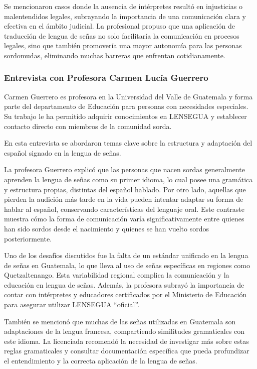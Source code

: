 Se mencionaron casos donde la ausencia de intérpretes resultó en injusticias o malentendidos legales, subrayando la importancia de una comunicación clara y efectiva en el ámbito judicial. La profesional propuso que una aplicación de traducción de lengua de señas no solo facilitaría la comunicación en procesos legales, sino que también promovería una mayor autonomía para las personas sordomudas, eliminando muchas barreras que enfrentan cotidianamente.

\subsubsection{Entrevista con Profesora Carmen Lucía Guerrero}

Carmen Guerrero es profesora en la Universidad del Valle de Guatemala y forma parte del departamento de Educación para personas con necesidades especiales. Su trabajo le ha permitido adquirir conocimientos en LENSEGUA y establecer contacto directo con miembros de la comunidad sorda.

En esta entrevista se abordaron temas clave sobre la estructura y adaptación del español signado en la lengua de señas. 

La profesora Guerrero explicó que las personas que nacen sordas generalmente aprenden la lengua de señas como su primer idioma, lo cual posee una gramática y estructura propias, distintas del español hablado. Por otro lado, aquellas que pierden la audición más tarde en la vida pueden intentar adaptar su forma de hablar al español, conservando características del lenguaje oral. Este contraste muestra cómo la forma de comunicación varía significativamente entre quienes han sido sordos desde el nacimiento y quienes se han vuelto sordos posteriormente.

Uno de los desafíos discutidos fue la falta de un estándar unificado en la lengua de señas en Guatemala, lo que lleva al uso de señas específicas en regiones como Quetzaltenango. Esta variabilidad regional complica la comunicación y la educación en lengua de señas. Además, la profesora subrayó la importancia de contar con intérpretes y educadores certificados por el Ministerio de Educación para asegurar utilizar LENSEGUA “oficial”. 

También se mencionó que muchas de las señas utilizadas en Guatemala son adaptaciones de la lengua francesa, compartiendo similitudes gramaticales con este idioma. La licenciada recomendó la necesidad de investigar más sobre estas reglas gramaticales y consultar documentación específica que pueda profundizar el entendimiento y la correcta aplicación de la lengua de señas.

